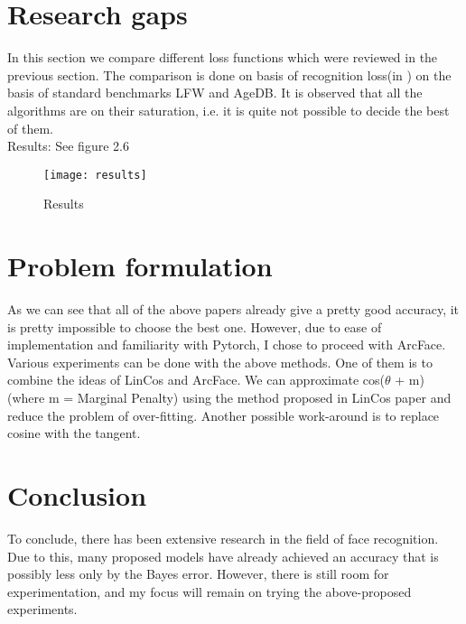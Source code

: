 \section{Research gaps}
In this section we compare different loss functions which were reviewed in the previous section. The comparison is done on basis of recognition loss(in ) on the basis of standard benchmarks LFW and AgeDB. It is observed that all the algorithms are on their saturation, i.e. it is quite not possible to decide the best of them.\\
Results: See figure 2.6
	\begin{figure}[!h]
    		\centering
    		\texttt{[image: results]}
    		\caption{Results}
	\end{figure}
\section{Problem formulation}
As we can see that all of the above papers already give a pretty good accuracy, it is pretty impossible to choose the best one. However, due to ease of implementation and familiarity with Pytorch, I chose to proceed with ArcFace. Various experiments can be done with the above methods. One of them is to combine the ideas of LinCos and ArcFace. We can approximate cos($\theta$ + m) (where m = Marginal Penalty) using the method proposed in LinCos paper and reduce the problem of over-fitting. Another possible work-around is to replace cosine with the tangent.
\section{Conclusion}
To conclude, there has been extensive research in the field of face recognition. Due to this, many proposed models have already achieved an accuracy that is possibly less only by the Bayes error. However, there is still room for experimentation, and my focus will remain on trying the above-proposed experiments.
